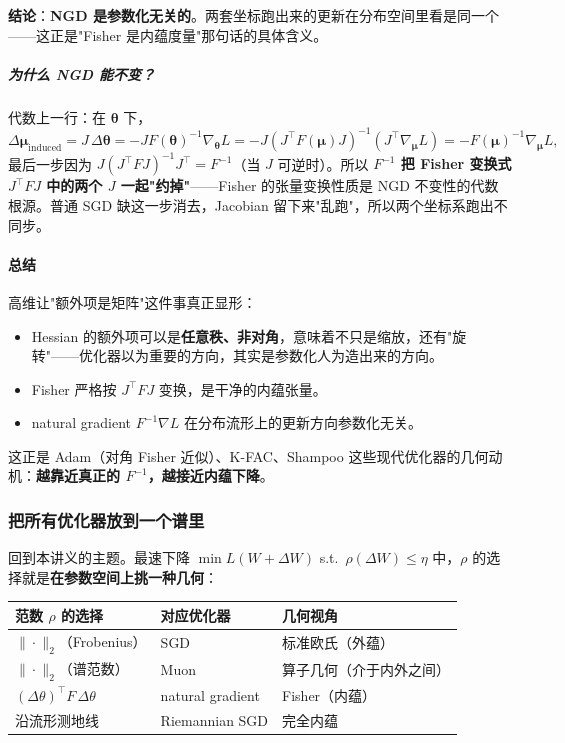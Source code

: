 \documentclass[11pt,a4paper]{article}
\theoremstyle{mythm}
\theoremstyle{mydef}
\begin{document}
\begin{center}
\end{center}

\textbf{结论}：\textbf{NGD 是参数化无关的}。两套坐标跑出来的更新在分布空间里看是同一个——这正是"Fisher 是内蕴度量"那句话的具体含义。

\subparagraph{为什么 NGD 能不变？}
代数上一行：在 $\boldsymbol\theta$ 下，
$$\Delta\boldsymbol\mu_{\text{induced}} = J\,\Delta\boldsymbol\theta = -J F(\boldsymbol\theta)^{-1}\nabla_{\boldsymbol\theta}L = -J(J^\top F(\boldsymbol\mu)J)^{-1}(J^\top \nabla_{\boldsymbol\mu}L) = -F(\boldsymbol\mu)^{-1}\nabla_{\boldsymbol\mu}L,$$
最后一步因为 $J(J^\top F J)^{-1}J^\top = F^{-1}$（当 $J$ 可逆时）。所以 \textbf{$F^{-1}$ 把 Fisher 变换式 $J^\top F J$ 中的两个 $J$ 一起"约掉"}——Fisher 的张量变换性质是 NGD 不变性的代数根源。普通 SGD 缺这一步消去，Jacobian 留下来"乱跑"，所以两个坐标系跑出不同步。

\paragraph{总结}
高维让"额外项是矩阵"这件事真正显形：
\begin{itemize}[leftmargin=2em]
\item Hessian 的额外项可以是\textbf{任意秩、非对角}，意味着不只是缩放，还有"旋转"——优化器以为重要的方向，其实是参数化人为造出来的方向。
\item Fisher 严格按 $J^\top F J$ 变换，是干净的内蕴张量。
\item natural gradient $F^{-1}\nabla L$ 在分布流形上的更新方向参数化无关。
\end{itemize}
这正是 Adam（对角 Fisher 近似）、K-FAC、Shampoo 这些现代优化器的几何动机：\textbf{越靠近真正的 $F^{-1}$，越接近内蕴下降}。

\subsubsection*{把所有优化器放到一个谱里}

回到本讲义的主题。最速下降 $\min L(W+\Delta W)$ s.t.\ $\rho(\Delta W)\le \eta$ 中，$\rho$ 的选择就是\textbf{在参数空间上挑一种几何}：

\begin{center}
\begin{tabular}{l|l|l}
\hline
范数 $\rho$ 的选择 & 对应优化器 & 几何视角 \\
\hline
$\|\cdot\|_2$（Frobenius） & SGD & 标准欧氏（外蕴） \\
$\|\cdot\|_2$（谱范数） & Muon & 算子几何（介于内外之间） \\
$(\Delta\theta)^\top F\,\Delta\theta$ & natural gradient & Fisher（内蕴） \\
沿流形测地线 & Riemannian SGD & 完全内蕴 \\
\hline
\end{tabular}
\end{center}
\end{document}
